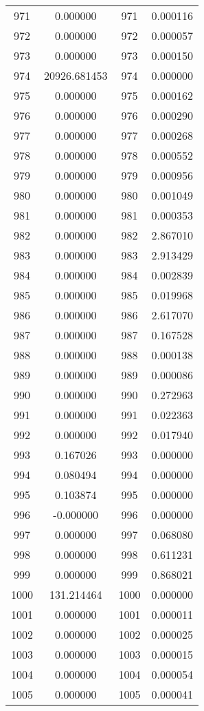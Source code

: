 \documentclass[12pt]{article}
\begin{document}
\begin{longtable}{@{}cccc@{}}
971 & 0.000000 & 971 & 0.000116 \\
972 & 0.000000 & 972 & 0.000057 \\
973 & 0.000000 & 973 & 0.000150 \\
974 & 20926.681453 & 974 & 0.000000 \\
975 & 0.000000 & 975 & 0.000162 \\
976 & 0.000000 & 976 & 0.000290 \\
977 & 0.000000 & 977 & 0.000268 \\
978 & 0.000000 & 978 & 0.000552 \\
979 & 0.000000 & 979 & 0.000956 \\
980 & 0.000000 & 980 & 0.001049 \\
981 & 0.000000 & 981 & 0.000353 \\
982 & 0.000000 & 982 & 2.867010 \\
983 & 0.000000 & 983 & 2.913429 \\
984 & 0.000000 & 984 & 0.002839 \\
985 & 0.000000 & 985 & 0.019968 \\
986 & 0.000000 & 986 & 2.617070 \\
987 & 0.000000 & 987 & 0.167528 \\
988 & 0.000000 & 988 & 0.000138 \\
989 & 0.000000 & 989 & 0.000086 \\
990 & 0.000000 & 990 & 0.272963 \\
991 & 0.000000 & 991 & 0.022363 \\
992 & 0.000000 & 992 & 0.017940 \\
993 & 0.167026 & 993 & 0.000000 \\
994 & 0.080494 & 994 & 0.000000 \\
995 & 0.103874 & 995 & 0.000000 \\
996 & -0.000000 & 996 & 0.000000 \\
997 & 0.000000 & 997 & 0.068080 \\
998 & 0.000000 & 998 & 0.611231 \\
999 & 0.000000 & 999 & 0.868021 \\
1000 & 131.214464 & 1000 & 0.000000 \\
1001 & 0.000000 & 1001 & 0.000011 \\
1002 & 0.000000 & 1002 & 0.000025 \\
1003 & 0.000000 & 1003 & 0.000015 \\
1004 & 0.000000 & 1004 & 0.000054 \\
1005 & 0.000000 & 1005 & 0.000041 \\

\end{longtable}
\end{document}
